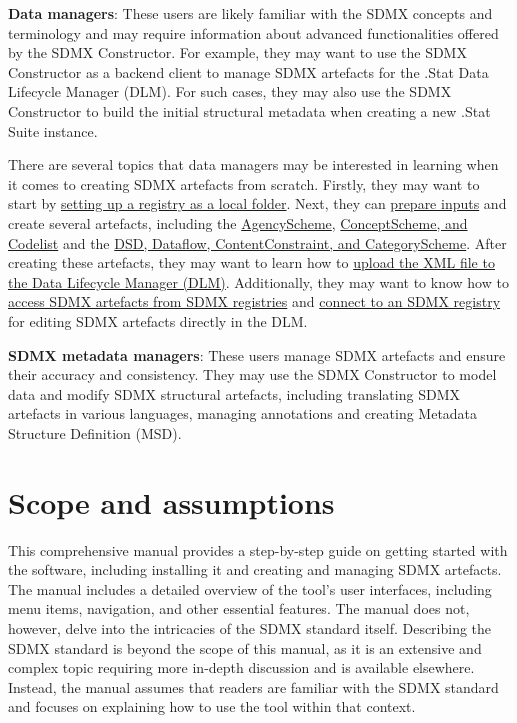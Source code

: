 \documentclass[
]{book}
\begin{document}
\textbf{Data managers}: These users are likely familiar with the SDMX concepts and terminology and may require information about advanced functionalities offered by the SDMX Constructor. For example, they may want to use the SDMX Constructor as a backend client to manage SDMX artefacts for the .Stat Data Lifecycle Manager (DLM). For such cases, they may also use the SDMX Constructor to build the initial structural metadata when creating a new .Stat Suite instance.

There are several topics that data managers may be interested in learning when it comes to creating SDMX artefacts from scratch. Firstly, they may want to start by \protect\hyperlink{setting-up}{setting up a registry as a local folder}. Next, they can \protect\hyperlink{preparing-inputs}{prepare inputs} and create several artefacts, including the \protect\hyperlink{creating-agencyscheme}{AgencyScheme}, \protect\hyperlink{creating-conceptscheme}{ConceptScheme, and Codelist} and the \protect\hyperlink{creating-dsd}{DSD, Dataflow, ContentConstraint, and CategoryScheme}. After creating these artefacts, they may want to learn how to \protect\hyperlink{uploading-xml}{upload the XML file to the Data Lifecycle Manager (DLM)}. Additionally, they may want to know how to \protect\hyperlink{accessing-sdmx}{access SDMX artefacts from SDMX registries} and \protect\hyperlink{connecting-to}{connect to an SDMX registry} for editing SDMX artefacts directly in the DLM.

\textbf{SDMX metadata managers}: These users manage SDMX artefacts and ensure their accuracy and consistency. They may use the SDMX Constructor to model data and modify SDMX structural artefacts, including translating SDMX artefacts in various languages, managing annotations and creating Metadata Structure Definition (MSD).

\hypertarget{scope-and-assumptions}{%
\section*{Scope and assumptions}\label{scope-and-assumptions}}

This comprehensive manual provides a step-by-step guide on getting started with the software, including installing it and creating and managing SDMX artefacts. The manual includes a detailed overview of the tool's user interfaces, including menu items, navigation, and other essential features. The manual does not, however, delve into the intricacies of the SDMX standard itself. Describing the SDMX standard is beyond the scope of this manual, as it is an extensive and complex topic requiring more in-depth discussion and is available elsewhere. Instead, the manual assumes that readers are familiar with the SDMX standard and focuses on explaining how to use the tool within that context.
\end{document}
